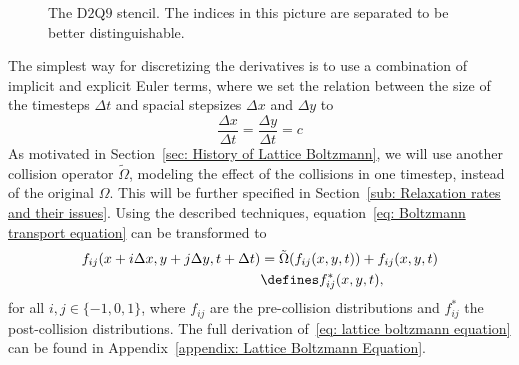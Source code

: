 \begin{figure}
  \centering
\caption{The D$2$Q$9$ stencil. The indices in this picture are separated to be better distinguishable.}
\label{fig: D2Q9 stencil}
\end{figure}

The simplest way for discretizing the derivatives is to use a combination of implicit and explicit Euler terms, where we set the relation between the size of the timesteps $\Delta t$ and spacial stepsizes $\Delta x$ and $\Delta y$ to
\begin{equation}
  \label{eq: relation between stepsizes}
  \frac{\Delta x} {\Delta{t}} = \frac{\Delta y} {\Delta{t}} = c
\end{equation}
As motivated in Section~\ref{sec: History of Lattice Boltzmann}, we will use another collision operator $\tilde{\Omega}$, modeling the effect of the collisions in one timestep, instead of the original $\Omega$.
This will be further specified in Section~\ref{sub: Relaxation rates and their issues}.
Using the described techniques, equation~\eqref{eq: Boltzmann transport equation} can be transformed to
\begin{equation}
  \label{eq: lattice boltzmann equation}
  \begin{aligned}
    f_{ij}(x + i \Delta x , y + j \Delta y,t + \Delta t)
    &= \tilde{\Omega}(f_{ij}(x,y,t))
    + f_{ij}(x,y,t)
    \\&
    \defines f_{ij}^*(x, y, t),
  \end{aligned}
\end{equation}
for all $i,j\in \{-1, 0, 1\}$, where $f_{ij}$ are the pre-collision distributions and $f_{ij}^*$ the post-collision distributions.
The full derivation of~\eqref{eq: lattice boltzmann equation} can be found in Appendix~\ref{appendix: Lattice Boltzmann Equation}.

